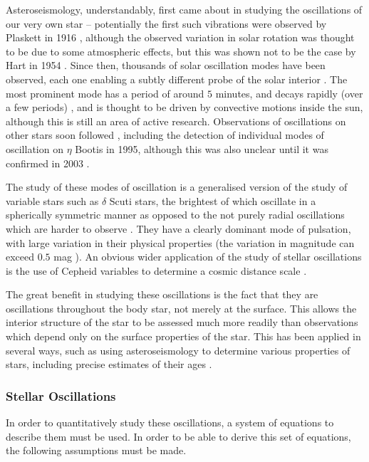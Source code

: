 \documentclass[11pt]{amsart}
\begin{document}
Asteroseismology, understandably, first came about in studying the oscillations of our very own star -- potentially the first such vibrations were observed by Plaskett in 1916 \cite{Plaskett1916}, although the  observed variation in solar rotation was thought to be due to some atmospheric effects, but this was shown not to be the case by Hart in 1954 \cite{Hart1954}.  Since then, thousands of solar oscillation modes have been observed, each one enabling a subtly different probe of the solar interior \cite{DiMauro2017}.  The most prominent mode has a period of around $5$ minutes, and decays rapidly (over a few periods) \cite{Ulrich1970},  and is thought to be driven by convective motions inside the sun, although this is still an area of active research.  Observations of oscillations on other stars soon followed \cite{Brown1991}, including the detection of individual modes of oscillation on $\eta$ Bootis in 1995, although this was also unclear until it was confirmed in 2003 \cite{Kjeldsen2003}.

The study of these modes of oscillation is a generalised version of the study of variable stars such as $\delta$ Scuti stars, the brightest of which oscillate in a spherically symmetric manner as opposed to the not purely radial oscillations which are harder to observe \cite{Garg2010}.  They have a clearly dominant mode of pulsation, with large variation in their physical properties (the variation in magnitude can exceed $0.5$ mag \cite{Garg2010}).  An obvious wider application of the study of stellar oscillations is the use of Cepheid variables to determine a cosmic distance scale \cite{Madore1991}.

The great benefit in studying these oscillations is the fact that they are oscillations throughout the body star, not merely at the surface.  This allows the interior structure of the star to be assessed much more readily than observations which depend only on the surface properties of the star.  This has been applied in several ways, such as using asteroseismology to determine various properties of stars, including precise estimates of their ages \cite{Chaplin2013} \cite{Cunha2007}.

\subsubsection{Stellar Oscillations}

In order to quantitatively study these oscillations, a system of equations to describe them must be used.  In order to be able to derive this set of equations, the following assumptions must be made.
\end{document}
